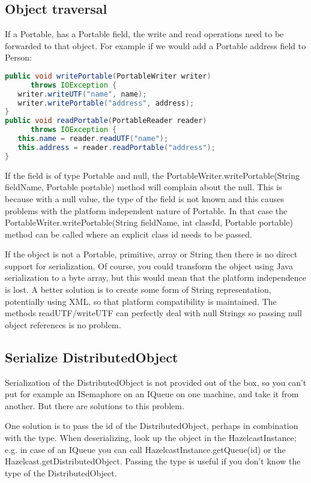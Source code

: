 \subsection*{Object traversal}
If a Portable, has a Portable field, the write and read operations need to be forwarded to that object. For example if we would add a Portable address field to Person:
\begin{lstlisting}[language=java]
public void writePortable(PortableWriter writer) 
      throws IOException {
   writer.writeUTF("name", name);
   writer.writePortable("address", address);
}
public void readPortable(PortableReader reader) 
      throws IOException {
   this.name = reader.readUTF("name");
   this.address = reader.readPortable("address");
}
\end{lstlisting}
If the field is of type Portable and null, the  PortableWriter.writePortable(String fieldName, Portable portable) method will complain about the null. This is because with a null value, the type of the field is not known and this causes problems with the platform independent nature of Portable. In that case the PortableWriter.writePortable(String fieldName, int classId, Portable portable) method can be called where an explicit class id needs to be passed. 

If the object is not a Portable, primitive, array or String then there is no direct support for serialization. Of course, you could transform the object using Java serialization to a byte array, but this would mean that the platform independence is lost. A better solution is to create some form of String representation, potentially using XML, so that platform compatibility is maintained. The methods readUTF/writeUTF can perfectly deal with null Strings so passing null object references is no problem.

\subsection*{Serialize DistributedObject}
Serialization of the DistributedObject is not provided out of the box, so you can't put for example an ISemaphore on an IQueue on one machine, and take it from another. But there are solutions to this problem.

One solution is to pass the id of the DistributedObject, perhaps in combination with the type. When deserializing, look up the object in the HazelcastInstance; e.g. in case of an IQueue you can call HazelcastInstance.getQueue(id) or the Hazelcast.getDistributedObject. Passing the type is useful if you don't know the type of the DistributedObject.

